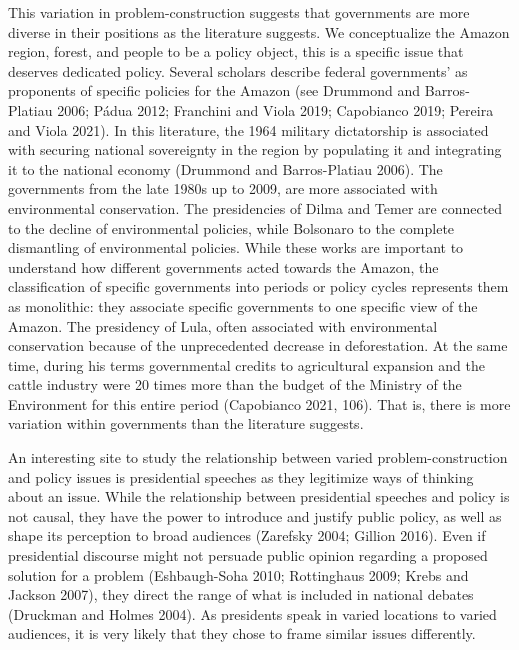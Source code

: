\documentclass[
]{article}
\begin{document}
This variation in problem-construction suggests that governments are
more diverse in their positions as the literature suggests. We
conceptualize the Amazon region, forest, and people to be a policy
object, this is a specific issue that deserves dedicated policy. Several
scholars describe federal governments' as proponents of specific
policies for the Amazon (see Drummond and Barros-Platiau 2006; Pádua
2012; Franchini and Viola 2019; Capobianco 2019; Pereira and Viola
2021). In this literature, the 1964 military dictatorship is associated
with securing national sovereignty in the region by populating it and
integrating it to the national economy (Drummond and Barros-Platiau
2006). The governments from the late 1980s up to 2009, are more
associated with environmental conservation. The presidencies of Dilma
and Temer are connected to the decline of environmental policies, while
Bolsonaro to the complete dismantling of environmental policies. While
these works are important to understand how different governments acted
towards the Amazon, the classification of specific governments into
periods or policy cycles represents them as monolithic: they associate
specific governments to one specific view of the Amazon. The presidency
of Lula, often associated with environmental conservation because of the
unprecedented decrease in deforestation. At the same time, during his
terms governmental credits to agricultural expansion and the cattle
industry were 20 times more than the budget of the Ministry of the
Environment for this entire period (Capobianco 2021, 106). That is,
there is more variation within governments than the literature suggests.

An interesting site to study the relationship between varied
problem-construction and policy issues is presidential speeches as they
legitimize ways of thinking about an issue. While the relationship
between presidential speeches and policy is not causal, they have the
power to introduce and justify public policy, as well as shape its
perception to broad audiences (Zarefsky 2004; Gillion 2016). Even if
presidential discourse might not persuade public opinion regarding a
proposed solution for a problem (Eshbaugh-Soha 2010; Rottinghaus 2009;
Krebs and Jackson 2007), they direct the range of what is included in
national debates (Druckman and Holmes 2004). As presidents speak in
varied locations to varied audiences, it is very likely that they chose
to frame similar issues differently.
\end{document}
